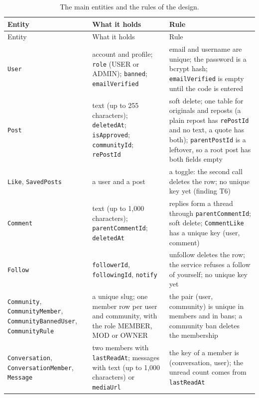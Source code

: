{\small\singlespacing
\begin{longtable}{@{}>{\raggedright\arraybackslash}p{4.0cm} >{\raggedright\arraybackslash}p{4.6cm} >{\raggedright\arraybackslash}p{\dimexpr\textwidth-8.6cm-4\tabcolsep\relax}@{}}
  \caption{The main entities and the rules of the design.}
  \label{tab:design-entities}\\
  \toprule
  Entity & What it holds & Rule \\
  \midrule
  \endfirsthead
  \toprule
  Entity & What it holds & Rule \\
  \midrule
  \endhead
  \bottomrule
  \endlastfoot
    \texttt{User} & account and profile; \texttt{role} (USER or ADMIN); \texttt{banned}; \texttt{emailVerified} & email and username are unique; the password is a bcrypt hash; \texttt{emailVerified} is empty until the code is entered \\
  \midrule
    \texttt{Post} & text (up to 255 characters); \texttt{deletedAt}; \texttt{isApproved}; \texttt{communityId}; \texttt{rePostId} & soft delete; one table for originals and reposts (a plain repost has \texttt{rePostId} and no text, a quote has both); \texttt{parentPostId} is a leftover, so a root post has both fields empty \\
  \midrule
    \texttt{Like}, \texttt{SavedPosts} & a user and a post & a toggle: the second call deletes the row; no unique key yet (finding T6) \\
  \midrule
    \texttt{Comment} & text (up to 1,000 characters); \texttt{parentCommentId}; \texttt{deletedAt} & replies form a thread through \texttt{parentCommentId}; soft delete; \texttt{CommentLike} has a unique key (user, comment) \\
  \midrule
    \texttt{Follow} & \texttt{followerId}, \texttt{followingId}, \texttt{notify} & unfollow deletes the row; the service refuses a follow of yourself; no unique key yet \\
  \midrule
    \texttt{Community}, \texttt{CommunityMember}, \texttt{CommunityBannedUser}, \texttt{CommunityRule} & a unique slug; one member row per user and community, with the role MEMBER, MOD or OWNER & the pair (user, community) is unique in members and in bans; a community ban deletes the membership \\
  \midrule
    \texttt{Conversation}, \texttt{ConversationMember}, \texttt{Message} & two members with \texttt{lastReadAt}; messages with text (up to 1,000 characters) or \texttt{mediaUrl} & the key of a member is (conversation, user); the unread count comes from \texttt{lastReadAt} \\

\end{longtable}}
